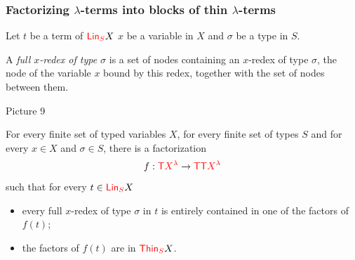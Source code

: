   



\subsubsection{Factorizing $\lambda$-terms into blocks of thin $\lambda$-terms}\label{subsub:facto}

\begin{definition}
Let $t$ be a term of ${\color{red}{\mathsf{Lin}_{S}}} X$ $x$ be a variable in $X$ and $\sigma$ be a type in $S$. 

 A \emph{full $x$-redex of type $\sigma$} is a set of nodes  containing an $x$-redex of type $\sigma$, the node of the variable $x$ bound by this redex, together with the set of nodes between them.
\end{definition}
\begin{center}
Picture 9
\end{center}


\begin{proposition}\label{prop:FactoIntoThin} For every finite set of typed variables $X$, for every finite set of types $S$ and for every $x\in X$ and $\sigma\in S$, there is a factorization $$f:{\color{red}{\mathsf T}} {\color{red}{X^\lambda}} \to {\color{red}{\mathsf T}}{\color{red}{\mathsf T}} {\color{red}{X^\lambda}}$$ 
such that for every $t\in{\color{red}{\mathsf{Lin}_{S}}} X$
\begin{itemize}
\item every full $x$-redex of type $\sigma$ in $t$ is entirely contained in one of the factors of $f(t)$;
\item the factors of $f(t)$ are in ${\color{red}{\mathsf{Thin}_{S}}} X$.
\end{itemize}
\end{proposition}

